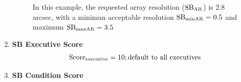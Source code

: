 \documentclass[a4paper,10pt,english]{sphinxmanual}
\begin{document}
\begin{enumerate}
\begin{figure}[htbp]
\caption{In this example, the requested array resolution (\(\rm{SB}_{\rm{AR}}\))
is 2.8 arcsec, with a minimun acceptable resolution
\(\rm{SB}_{\rm{minAR}} = 0.5\) and maximum
\(\rm{SB}_{\rm{maxAR}} = 3.5\)}\end{figure}

\item {} 
\textbf{SB Executive Score}
\label{algorithm:equation-exscore}\begin{gather}
\begin{split}\rm{Score}_{\rm{executive}} = 10; \rm{default\ to\ all\ executives}\end{split}\label{algorithm-exscore}
\end{gather}
\item {} 
\textbf{SB Condition Score}


\end{enumerate}
\end{document}
